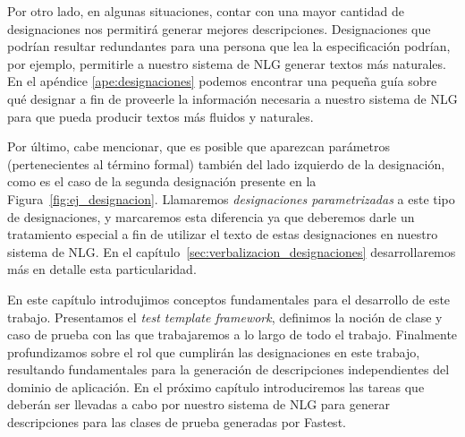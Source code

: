Por otro lado, en algunas situaciones, contar con una mayor cantidad de designaciones nos permitirá generar mejores descripciones. Designaciones que podrían resultar redundantes para una persona que lea la especificación podrían, por ejemplo, permitirle a nuestro sistema de NLG generar textos más naturales. En el apéndice \ref{ape:designaciones} podemos encontrar una pequeña guía sobre qué designar a fin de proveerle la información necesaria a nuestro sistema de NLG para que pueda producir textos más fluidos y naturales.

Por último, cabe mencionar, que es posible que aparezcan parámetros (pertenecientes al término formal) también del lado izquierdo de la designación, como es el caso de la segunda designación presente en la Figura~\ref{fig:ej_designacion}. Llamaremos \emph{designaciones parametrizadas} a este tipo de designaciones, y marcaremos esta diferencia ya que deberemos darle un tratamiento especial a fin de utilizar el texto de estas designaciones en nuestro sistema de NLG. En el capítulo~\ref{sec:verbalizacion_designaciones} desarrollaremos más en detalle esta particularidad. 


\bigskip
En este capítulo introdujimos conceptos fundamentales para el desarrollo de este trabajo. Presentamos el \textit{test template framework}, definimos la noción de clase y caso de prueba con las que trabajaremos a lo largo de todo el trabajo. Finalmente profundizamos sobre el rol que cumplirán las designaciones en este trabajo, resultando fundamentales para la generación de descripciones independientes del dominio de aplicación. En el próximo capítulo introduciremos las tareas que deberán ser llevadas a cabo por nuestro sistema de NLG para generar descripciones para las clases de prueba generadas por Fastest.